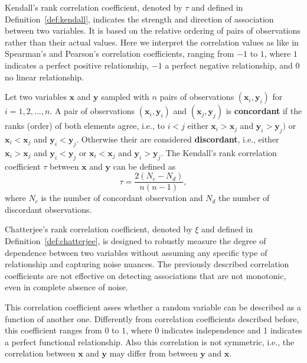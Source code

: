 Kendall's rank correlation coefficient, denoted by $\tau$ and defined in Definition~\ref{def:kendall},  indicates the strength and direction of association between two variables. It is based on the relative ordering of pairs of observations rather than their actual values. Here we interpret the correlation values as like in Spearman's and Pearson's correlation coefficients, ranging from $-1$ to $1$, where $1$ indicates a perfect positive relationship, $-1$ a perfect negative relationship, and $0$  no linear relationship.

\begin{definition}\label{def:kendall}
Let two variables $\mathbf{x}$ and $\mathbf{y}$ sampled with $n$ pairs of observations $(\mathbf{x}_i, \mathbf{y}_i)$ for $i = 1, 2, \ldots, n$. A pair of observations $(\mathbf{x}_i, \mathbf{y}_i)$ and $(\mathbf{x}_j, \mathbf{y}_j)$ is \textbf{concordant} if the ranks (order) of both elements agree, i.e., to $i < j$ either $\mathbf{x}_i > \mathbf{x}_j$ and $\mathbf{y}_i > \mathbf{y}_j)$ or $\mathbf{x}_i < \mathbf{x}_j$ and $\mathbf{y}_i < \mathbf{y}_j$. Otherwise their are considered \textbf{discordant}, i.e., either $\mathbf{x}_i > \mathbf{x}_j$ and $\mathbf{y}_i < \mathbf{y}_j$ or $\mathbf{x}_i < \mathbf{x}_j$ and $\mathbf{y}_i > \mathbf{y}_j$. The Kendall's rank correlation coefficient $\tau$ between $\mathbf{x}$ and $\mathbf{y}$ can be defined as 
\begin{equation}\label{eq:kendall}
\tau = \frac{2(N_c - N_d)}{n(n-1)},
\end{equation}
where $N_c$ is the number of concordant observation and $N_d$ the number of discordant observations.
\end{definition}

Chatterjee's rank correlation coefficient, denoted by $\xi$ and defined in Definition~\ref{def:chatterjee}, is designed to robustly measure the degree of dependence between two variables without assuming any specific type of relationship and capturing noise nuances.  The previously described correlation coefficients are not effective on detecting associations that are not monotonic, even in complete absence of noise.

This correlation coefficient asses whether a random variable can be described as a function of another one. Differently from correlation coefficients described before, this coefficient ranges from $0$ to $1$, where $0$ indicates independence and 1 indicates a perfect functional relationship. Also this correlation is not symmetric, i.e., the correlation between $\mathbf{x}$ and $\mathbf{y}$ may differ from between $\mathbf{y}$ and $\mathbf{x}$. 



